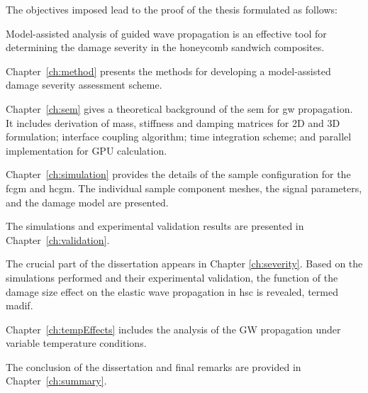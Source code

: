 The objectives imposed lead to the proof of the thesis formulated as follows:
\begin{thesis*}  
	Model-assisted analysis of guided wave propagation is an effective tool for determining the damage severity in the honeycomb sandwich composites.
\label{thesis}
\end{thesis*}

Chapter~\ref{ch:method} presents the methods for developing a model-assisted damage severity assessment scheme.

Chapter~\ref{ch:sem} gives a theoretical background of the \ac{sem} for \ac{gw} propagation.
It includes derivation of mass, stiffness and damping matrices for 2D and 3D formulation; interface coupling algorithm; time integration scheme; and parallel implementation for GPU calculation.

Chapter~\ref{ch:simulation} provides the details of the sample configuration for the \ac{fcgm} and \ac{hcgm}.
The individual sample component meshes, the signal parameters, and the damage model are presented.

The simulations and experimental validation results are presented in Chapter~\ref{ch:validation}.

The crucial part of the dissertation appears in Chapter \ref{ch:severity}. Based on the simulations performed and their experimental validation, the function of the damage size effect on the elastic wave propagation in \ac{hsc} is revealed, termed \ac{madif}.

Chapter~\ref{ch:tempEffects} includes the analysis of the GW propagation under variable temperature conditions.

The conclusion of the dissertation and final remarks are provided in Chapter~\ref{ch:summary}.

